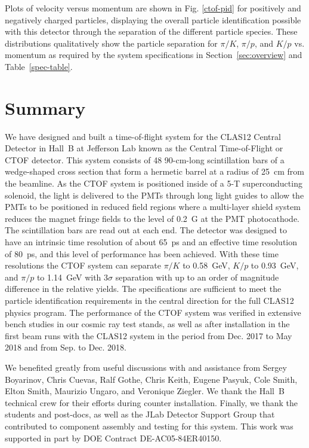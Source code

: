 \documentclass{elsart}
\begin{document}
Plots of velocity versus momentum are shown in Fig. \ref{ctof-pid} for positively and negatively charged
particles, displaying the overall particle identification possible with this detector through the separation
of the different particle species. These distributions qualitatively show the particle separation for $\pi/K$,
$\pi/ p$, and $K/p$ vs. momentum as required by the system specifications in Section~\ref{sec:overview}
and Table~\ref{spec-table}.

\section{Summary}
\label{sec:summary}

We have designed and built a time-of-flight system for the CLAS12 Central Detector in Hall~B 
at Jefferson Lab known as the Central Time-of-Flight or CTOF detector. This system consists 
of 48 90-cm-long scintillation bars of a wedge-shaped cross section that form a hermetic barrel
at a radius of 25~cm from the beamline. As the CTOF system is positioned inside of a 5-T
superconducting solenoid, the light is delivered to the PMTs through long light guides to allow the
PMTs to be positioned in reduced field regions where a multi-layer shield system reduces the
magnet fringe fields to the level of 0.2~G at the PMT photocathode. The scintillation bars are read
out at each end. The detector was designed to have an intrinsic time resolution of about 65~ps and
an effective time resolution of 80~ps, and this level of performance has been achieved. With these
time resolutions the CTOF system can separate $\pi/K$ to 0.58~GeV, $K/p$ to 0.93~GeV, and
$\pi/p$ to 1.14~GeV with 3$\sigma$ separation with up to an order of magnitude difference in the
relative yields.  The specifications are sufficient to meet the particle identification requirements in
the central direction for the full CLAS12 physics program. The performance of the CTOF system was
verified in extensive bench studies in our cosmic ray test stands, as well as after installation in the
first beam runs with the CLAS12 system in the period from Dec. 2017 to May 2018 and from Sep. to
Dec. 2018. 

\ack

We benefited greatly from useful discussions with and assistance from Sergey Boyarinov, Chris
Cuevas, Ralf Gothe, Chris Keith, Eugene Pasyuk, Cole Smith, Elton Smith, Maurizio Ungaro, and
Veronique Ziegler. We thank the Hall~B technical crew for their efforts during counter installation.
Finally, we thank the students and post-docs, as well as the JLab Detector Support Group that
contributed to component assembly and testing for this system. This work was supported in part
by DOE Contract DE-AC05-84ER40150.
\end{document}
